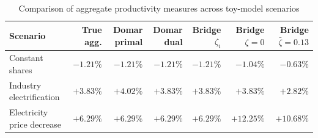 \begin{table}[!htbp]
\scriptsize
\centering
\caption{Comparison of aggregate productivity measures across toy-model scenarios}
\label{tab_varshares}
\setlength{\tabcolsep}{3pt}
\begin{tabular}{lrrrrrr}
\hline
Scenario & True agg. & Domar primal & Domar dual & Bridge $\zeta_i$ & Bridge $\zeta=0$ & Bridge $\bar\zeta=0.13$ \\
\hline
Constant shares & $-1.21 \% $ & $-1.21 \% $ & $-1.21 \% $ & $-1.21 \% $ & $-1.04 \% $ & $-0.63 \% $ \\
Industry electrification & $+3.83 \% $ & $+4.02 \% $ & $+3.83 \% $ & $+3.83 \% $ & $+3.83 \% $ & $+2.82 \% $ \\
Electricity price decrease & $+6.29 \% $ & $+6.29 \% $ & $+6.29 \% $ & $+6.29 \% $ & $+12.25 \% $ & $+10.68 \% $ \\
\hline
\end{tabular}
\end{table}
